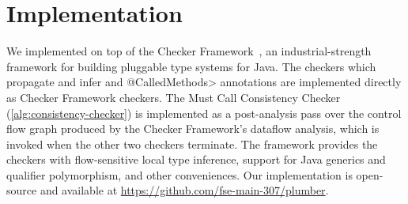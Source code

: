 \section{Implementation}
\label{sec:implementation}

We implemented \Tool on top of the Checker Framework~\cite{PapiACPE2008},
an industrial-strength framework for building pluggable type systems
for Java. The checkers which propagate and infer \MustCall and
\<@CalledMethods> annotations are implemented
directly as Checker Framework checkers.  The Must Call Consistency
Checker (\cref{alg:consistency-checker}) is
implemented as a post-analysis pass over the control flow graph
produced by the Checker Framework's dataflow analysis, which is invoked
when the other two checkers terminate. The framework provides the
checkers with flow-sensitive local type
inference, support for Java generics and qualifier polymorphism, and
other conveniences. Our implementation is open-source and available
at \url{https://github.com/fse-main-307/plumber}.
